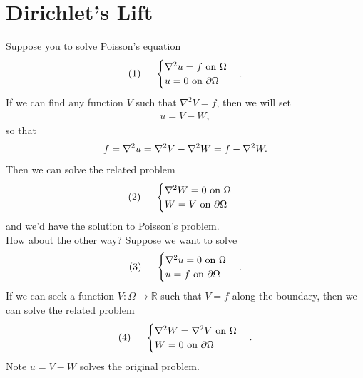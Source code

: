 \documentclass{book}
\theoremstyle{definition}
\newcommand{\p}{\partial}
\newcommand{\R}{\mathbb{R}}
\begin{document}
\section{Dirichlet's Lift}
Suppose you to solve Poisson's equation
\begin{align*}
(1)\hspace{0.5cm}\begin{cases}
\nabla^2 u = f \text{ on }\Omega\\
u=0 \text{ on $\p\Omega$}
\end{cases}.
\end{align*}
If we can find any function $V$ such that $\nabla^2 V = f$, then we will set
\begin{align*}
u  =V - W,
\end{align*}
so that
\begin{align*}
f = \laplacian u = \laplacian V - \laplacian W = f - \laplacian W.
\end{align*}
Then we can solve the related problem
\begin{align*}
(2)\hspace{0.5cm}\begin{cases}
\nabla^2 W = 0 \text{ on }\Omega\\
W=V \text{ on $\p\Omega$}
\end{cases}
\end{align*}
and we'd have the solution to Poisson's problem.\\

How about the other way? Suppose we want to solve
\begin{align*}
(3)\hspace{0.5cm}\begin{cases}
\nabla^2 u = 0 \text{ on }\Omega\\
u=f \text{ on $\p\Omega$}
\end{cases}.
\end{align*}
If we can seek a function $V:\Omega \to \R$ such that $V = f$ along the boundary, then we can solve the related problem
\begin{align*}
(4)\hspace{0.5cm}\begin{cases}
\nabla^2 W = \laplacian V \text{ on }\Omega\\
W = 0 \text{ on $\p\Omega$}
\end{cases}.
\end{align*}
Note $u = V-W$ solves the original problem.\\
\end{document}
